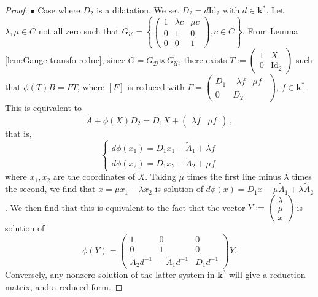 \documentclass[a4paper,11pt]{amsart}
\newcommand{\Gdiag}{G_{\mathcal{D}}}
\newcommand{\Gunip}{G_{\mathcal{U}}}
\begin{document}
\begin{proof}
$\bullet$ Case where $D_2$ is a dilatation. We set $D_2=d\mathrm{Id}_2$ with $d\in \mathbf{k}^*$. Let $\lambda,\mu\in C$ not all zero such that 
$\Gunip=\left\{ \begin{pmatrix}
1& \lambda c& \mu c \\ 
0 & 1 &0 \\
0&0&1
\end{pmatrix}, c\in C \right\}$. From Lemma \ref{lem:Gauge transfo reduc}, since $G = \Gdiag \ltimes \Gunip$, there exists $T:=\begin{pmatrix}
 1 & X \\ 0 & \mathrm{Id}_2
\end{pmatrix}$ such that $\phi(T)B=FT$,
 where $[F]$ is reduced with $F=\begin{pmatrix}
D_1& \begin{matrix} \lambda f& \mu f\end{matrix} \\
0 &D_2
\end{pmatrix}$, $f\in  \mathbf{k}^*$.
This is equivalent to
$$\widetilde{A}+\phi(X)D_2=D_1X+\begin{pmatrix}\lambda f & \mu f  \end{pmatrix}\, ,$$
that is,
$$
\left\lbrace\begin{array}{l}
     d \phi (x_1) = D_1 x_1 - \widetilde{A}_1 +\lambda f  \\
     d \phi (x_2) = D_1 x_2 - \widetilde{A}_2 +\mu f 
\end{array}\right.
$$
where $x_1,x_2$ are the coordinates of $X$. 
Taking $\mu$ times the first line minus $\lambda$ times the second,  we find that $x=\mu x_1-\lambda x_2$ is solution of $d\phi(x)=D_1 x- \mu \widetilde{A}_1 +\lambda  \widetilde{A}_2$. 
We then find that
 this is equivalent to the fact that the vector $Y:= \begin{pmatrix} \lambda\\ \mu \\ x \end{pmatrix}$ is solution of 
\begin{equation}
\label{eq:eqverif3}
    \phi(Y)=
 \begin{pmatrix}1 & 0 & 0  \\
0&1&0\\
\widetilde{A}_2d^{-1} & -\widetilde{A}_1 d^{-1} & D_1d^{-1}
 \end{pmatrix}Y.
\end{equation}
Conversely, any nonzero solution of the latter system in $\mathbf{k}^3$ will give a reduction matrix, and a reduced form.
\end{proof}
\end{document}
